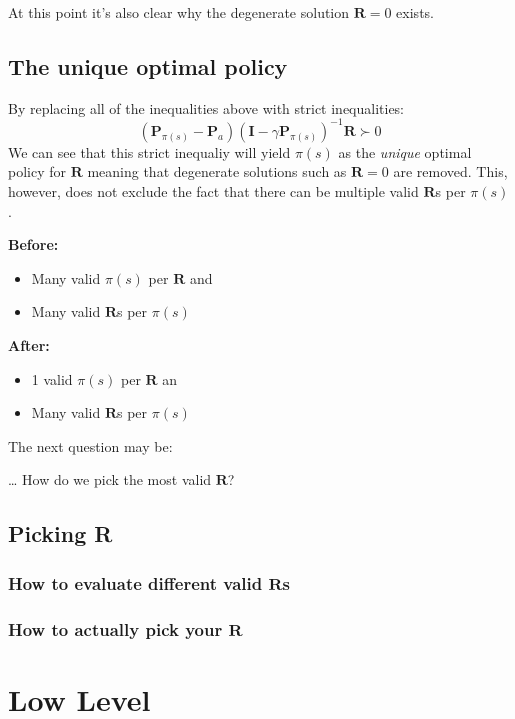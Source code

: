 \documentclass{article}
\begin{document}
    At this point it's also clear why the degenerate solution $\mathbf{R} = 0$ exists.

    \subsection{The unique optimal policy}
    By replacing all of the inequalities above with strict inequalities:
    $$(\mathbf{P}_{\pi(s)} - \mathbf{P}_a)(\mathbf{I} - \gamma \mathbf{P}_{\pi(s)})^{-1} \mathbf{R} \succ 0$$
    We can see that this strict inequaliy will yield $\pi(s)$ as the \emph{unique} optimal policy for $\mathbf{R}$ meaning that degenerate solutions such as $\mathbf{R} = 0$ are removed. This, however, does not exclude the fact that there can be multiple valid $\mathbf{R}$s per $\pi(s)$.

    \textbf{Before:}
    \begin{itemize}
        \item Many valid $\pi(s)$ per $\mathbf{R}$ and
        \item Many valid $\mathbf{R}$s per $\pi(s)$
    \end{itemize}

    \textbf{After:} 
    \begin{itemize}
        \item 1 valid $\pi(s)$ per $\mathbf{R}$ an
        \item Many valid $\mathbf{R}$s per $\pi(s)$
    \end{itemize}

    The next question may be:

    \dots
    How do we pick the most valid $\mathbf{R}$?

    \subsection{Picking R}
   
    \subsubsection{How to evaluate different valid $\mathbf{R}$s}



    \subsubsection{How to actually pick your $\mathbf{R}$}

    \section{Low Level}
\end{document}
